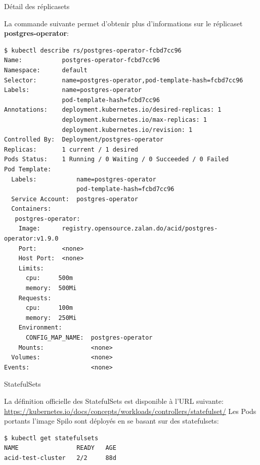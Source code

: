 \begin{frame}[fragile,shrink=7]{Détail des réplicasets}

La commande suivante permet d'obtenir plus d'informations sur le réplicaset \textbf{postgres-operator}:
\begin{tiny}
\begin{Verbatim}[commandchars=\&\#\#]
$ kubectl describe rs/postgres-operator-fcbd7cc96
Name:           postgres-operator-fcbd7cc96
Namespace:      default
Selector:       name=postgres-operator,pod-template-hash=fcbd7cc96
Labels:         name=postgres-operator
                pod-template-hash=fcbd7cc96
Annotations:    deployment.kubernetes.io/desired-replicas: 1
                deployment.kubernetes.io/max-replicas: 1
                deployment.kubernetes.io/revision: 1
Controlled By:  Deployment/postgres-operator
Replicas:       1 current / 1 desired
Pods Status:    1 Running / 0 Waiting / 0 Succeeded / 0 Failed
Pod Template:
  Labels:           name=postgres-operator
                    pod-template-hash=fcbd7cc96
  Service Account:  postgres-operator
  Containers:
   postgres-operator:
    Image:      registry.opensource.zalan.do/acid/postgres-operator:v1.9.0
    Port:       <none>
    Host Port:  <none>
    Limits:
      cpu:     500m
      memory:  500Mi
    Requests:
      cpu:     100m
      memory:  250Mi
    Environment:
      CONFIG_MAP_NAME:  postgres-operator
    Mounts:             <none>
  Volumes:              <none>
Events:                 <none>
\end{Verbatim}
\end{tiny}

\end{frame}


\begin{frame}[fragile]{StatefulSets}

   La définition officielle des StatefulSets est disponible à l'URL suivante: \url{https://kubernetes.io/docs/concepts/workloads/controllers/statefulset/}
   Les Pods portants l'image Spilo sont déployés en se basant sur des statefulsets:
\begin{tiny}
\begin{Verbatim}[commandchars=\&\#\#]
$ kubectl get statefulsets
NAME                READY   AGE
acid-test-cluster   2/2     88d
\end{Verbatim}
\end{tiny}

\end{frame}

